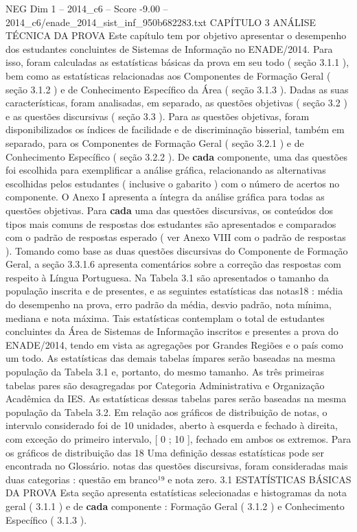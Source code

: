 \begin{textsample}{NEG Dim 1 – 2014\_c6 – Score -9.00 – 2014\_c6/enade\_2014\_sist\_inf\_950b682283.txt}  \label{ex:f1_neg_013}
CAPÍTULO 3 ANÁLISE TÉCNICA DA PROVA Este capítulo tem por objetivo apresentar o desempenho dos estudantes concluintes de Sistemas de Informação no ENADE/2014.
Para isso, foram calculadas as estatísticas básicas da prova em seu todo ( seção 3.1.1 ), bem como as estatísticas relacionadas aos Componentes de Formação Geral ( seção 3.1.2 ) e de Conhecimento Específico da Área ( seção 3.1.3 ).
Dadas as suas características, foram analisadas, em separado, as questões objetivas ( seção 3.2 ) e as questões discursivas ( seção 3.3 ).
Para as questões objetivas, foram disponibilizados os índices de facilidade e de discriminação bisserial, também em separado, para os Componentes de Formação Geral ( seção 3.2.1 ) e de Conhecimento Específico ( seção 3.2.2 ).
De \textbf{cada} componente, uma das questões foi escolhida para exemplificar a análise gráfica, relacionando as alternativas escolhidas pelos estudantes ( inclusive o gabarito ) com o número de acertos no componente.
O Anexo I apresenta a íntegra da análise gráfica para todas as questões objetivas.
Para \textbf{cada} uma das questões discursivas, os conteúdos dos tipos mais comuns de respostas dos estudantes são apresentados e comparados com o padrão de respostas esperado ( ver Anexo VIII com o padrão de respostas ).
Tomando como base as duas questões discursivas do Componente de Formação Geral, a seção 3.3.1.6 apresenta comentários sobre a correção das respostas com respeito à Língua Portuguesa.
Na Tabela 3.1 são apresentados o tamanho da população inscrita e de presentes, e as seguintes estatísticas das notas18 : média do desempenho na prova, erro padrão da média, desvio padrão, nota mínima, mediana e nota máxima.
Tais estatísticas contemplam o total de estudantes concluintes da Área de Sistemas de Informação inscritos e presentes a prova do ENADE/2014, tendo em vista as agregações por Grandes Regiões e o país como um todo.
As estatísticas das demais tabelas ímpares serão baseadas na mesma população da Tabela 3.1 e, portanto, do mesmo tamanho.
As três primeiras tabelas pares são desagregadas por Categoria Administrativa e Organização Acadêmica da IES.
As estatísticas dessas tabelas pares serão baseadas na mesma população da Tabela 3.2.
Em relação aos gráficos de distribuição de notas, o intervalo considerado foi de 10 unidades, aberto à esquerda e fechado à direita, com exceção do primeiro intervalo, [ 0 ; 10 ], fechado em ambos os extremos.
Para os gráficos de distribuição das 18 Uma definição dessas estatísticas pode ser encontrada no Glossário. notas das questões discursivas, foram consideradas mais duas categorias : questão em branco¹⁹ e nota zero. 3.1 ESTATÍSTICAS BÁSICAS DA PROVA Esta seção apresenta estatísticas selecionadas e histogramas da nota geral ( 3.1.1 ) e de \textbf{cada} componente : Formação Geral ( 3.1.2 ) e Conhecimento Específico ( 3.1.3 ).

\end{textsample}
